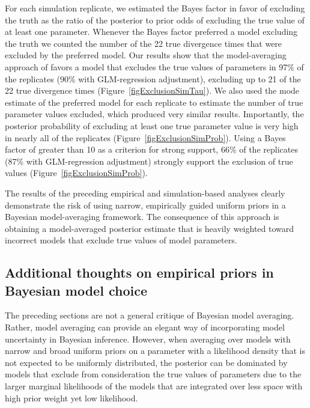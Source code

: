 For each simulation replicate, we estimated the Bayes factor in favor
of excluding the truth as the ratio of the posterior to prior odds of
excluding the true value of at least one parameter.
Whenever the Bayes factor preferred a model excluding the truth we counted the
number of the 22 true divergence times that were excluded by the preferred
model.
Our results show that the model-averaging approach of \citet{Hickerson2013}
favors a model that excludes the true values of parameters in 97\% of the
replicates (90\% with GLM-regression adjustment), excluding up to 21 of the 22
true divergence times (Figure~\ref{figExclusionSimTau}).
We also used the mode estimate of the preferred model for each replicate to
estimate the number of true parameter values excluded, which produced very
similar results.
Importantly, the posterior probability of excluding at least one true parameter
value is very high in nearly all of the replicates
(Figure~\ref{figExclusionSimProb}).
Using a Bayes factor of greater than 10 as a criterion for strong support, 66\%
of the replicates (87\% with GLM-regression adjustment) strongly support the
exclusion of true values (Figure~\ref{figExclusionSimProb}).

The results of the preceding empirical and simulation-based analyses clearly
demonstrate the risk of using narrow, empirically guided uniform priors in a
Bayesian model-averaging framework.
The consequence of this approach is obtaining a model-averaged posterior
estimate that is heavily weighted toward incorrect models that exclude true
values of model parameters.


\subsection*{Additional thoughts on empirical priors in Bayesian model choice}
The preceding sections are not a general critique of Bayesian model averaging.
Rather, model averaging can provide an elegant way of incorporating
model uncertainty in Bayesian inference.
However, when averaging over models with narrow and broad uniform priors on a
parameter with a likelihood density that is not expected to be uniformly
distributed, the posterior can be dominated by models that exclude from
consideration the true values of parameters due to the larger marginal
likelihoods of the models that are integrated over less space with high prior
weight yet low likelihood.

